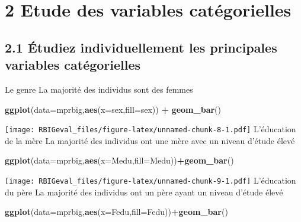 \documentclass[
]{article}
\newenvironment{Shaded}{\begin{snugshade}}{\end{snugshade}}
\newcommand{\DataTypeTok}[1]{\textcolor[rgb]{0.13,0.29,0.53}{#1}}
\newcommand{\KeywordTok}[1]{\textcolor[rgb]{0.13,0.29,0.53}{\textbf{#1}}}
\newcommand{\NormalTok}[1]{#1}
\newcommand{\OperatorTok}[1]{\textcolor[rgb]{0.81,0.36,0.00}{\textbf{#1}}}
\newcommand{\StringTok}[1]{\textcolor[rgb]{0.31,0.60,0.02}{#1}}
\begin{document}
\hypertarget{etude-des-variables-catuxe9gorielles}{%
\section{2 Etude des variables
catégorielles}\label{etude-des-variables-catuxe9gorielles}}

\hypertarget{uxe9tudiez-individuellement-les-principales-variables-catuxe9gorielles}{%
\subsection{2.1 Étudiez individuellement les principales variables
catégorielles}\label{uxe9tudiez-individuellement-les-principales-variables-catuxe9gorielles}}

Le genre La majorité des individus sont des femmes

\begin{Shaded}
\begin{Highlighting}[]
\KeywordTok{ggplot}\NormalTok{(}\DataTypeTok{data=}\NormalTok{mprbig,}\KeywordTok{aes}\NormalTok{(}\DataTypeTok{x=}\NormalTok{sex,}\DataTypeTok{fill=}\NormalTok{sex)) }\OperatorTok{+}\StringTok{ }\KeywordTok{geom_bar}\NormalTok{()}
\end{Highlighting}
\end{Shaded}

\texttt{[image: RBIGeval\_files/figure-latex/unnamed-chunk-8-1.pdf]}
L'éducation de la mère La majorité des individus ont une mère avec un
niveau d'étude élevé

\begin{Shaded}
\begin{Highlighting}[]
\KeywordTok{ggplot}\NormalTok{(}\DataTypeTok{data=}\NormalTok{mprbig,}\KeywordTok{aes}\NormalTok{(}\DataTypeTok{x=}\NormalTok{Medu,}\DataTypeTok{fill=}\NormalTok{Medu))}\OperatorTok{+}\KeywordTok{geom_bar}\NormalTok{()}
\end{Highlighting}
\end{Shaded}

\texttt{[image: RBIGeval\_files/figure-latex/unnamed-chunk-9-1.pdf]}
L'éducation du père La majorité des individus ont un père ayant un
niveau d'étude élevé

\begin{Shaded}
\begin{Highlighting}[]
\KeywordTok{ggplot}\NormalTok{(}\DataTypeTok{data=}\NormalTok{mprbig,}\KeywordTok{aes}\NormalTok{(}\DataTypeTok{x=}\NormalTok{Fedu,}\DataTypeTok{fill=}\NormalTok{Fedu))}\OperatorTok{+}\KeywordTok{geom_bar}\NormalTok{()}
\end{Highlighting}
\end{Shaded}
\end{document}
